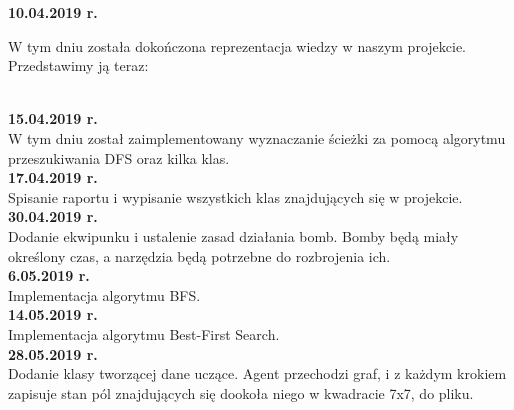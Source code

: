 \documentclass[12pt]{article}
\newcounter{coun}[section]
\begin{document}
\noindent\textbf{10.04.2019 r.}\\
\setcounter{coun}{0}

W tym dniu została dokończona reprezentacja wiedzy w naszym projekcie.
Przedstawimy ją teraz:

\\

\noindent\textbf{15.04.2019 r.}
\setcounter{coun}{0}\\

W tym dniu został zaimplementowany wyznaczanie ścieżki za pomocą algorytmu przeszukiwania DFS oraz kilka klas.\\

\noindent\textbf{17.04.2019 r.}
\setcounter{coun}{0}\\

Spisanie raportu i wypisanie wszystkich klas znajdujących się w projekcie.\\

\noindent\textbf{30.04.2019 r.}
\setcounter{coun}{0}\\

Dodanie ekwipunku i ustalenie zasad działania bomb. Bomby będą miały określony czas, a narzędzia będą potrzebne do rozbrojenia ich. \\

\noindent\textbf{6.05.2019 r.}
\setcounter{coun}{0}\\

Implementacja algorytmu BFS. \\ 

\noindent\textbf{14.05.2019 r.}
\setcounter{coun}{0}\\

Implementacja algorytmu Best-First Search. \\


\noindent\textbf{28.05.2019 r.}
\setcounter{coun}{0}\\

Dodanie klasy tworzącej dane uczące. Agent przechodzi graf, i z każdym krokiem zapisuje stan pól znajdujących się dookoła niego w kwadracie 7x7, do pliku.\\
\end{document}
